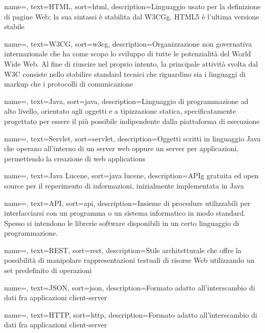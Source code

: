 {
	name=,
	text=HTML,
	sort=html,
	description={Linguaggio usato per la definizione di pagine Web; la sua sintassi è stabilita dal \gls{W3CGg}. HTML5 è l’ultima versione stabile}
}

{
	name=,
	text=W3CG,
	sort=w3cg,
	description={Organizzazione non governativa internazionale che ha come scopo lo sviluppo di tutte le potenzialità del World Wide Web. Al fine di riuscire nel proprio intento, la principale attività svolta dal W3C consiste nello stabilire standard tecnici che riguardino sia i linguaggi di markup che i protocolli di comunicazione}
}

{
	name=,
	text=Java,
	sort=java,
	description={Linguaggio di programmazione ad alto livello, orientato agli oggetti e a tipizzazione statica, specificatamente progettato per essere il più possibile indipendente dalla piattaforma di esecuzione}
}

{
	name=,
	text=Servlet,
	sort=servlet,
	description={Oggetti scritti in linguaggio \gls{Java} che operano all'interno di un server web oppure un server per applicazioni, permettendo la creazione di web applications}
}

{
	name=,
	text=Java Lucene,
	sort=java lucene,
	description={\gls{APIg} gratuita ed \gls{open source} per il reperimento di informazioni, inizialmente implementata in \gls{Java}}
}

{
	name=,
	text=API,
	sort=api,
	description={Insieme di procedure utilizzabili per interfacciarsi con un programma o un sistema informatico in modo standard. Spesso si intendono le librerie software disponibili in un certo linguaggio di programmazione.
	}
}

{
	name=,
	text=REST,
	sort=rest,
	description={Stile architetturale che offre la possibilità di manipolare rappresentazioni testuali di risorse Web utilizzando un set predefinito di operazioni}
}

{
	name=,
	text=JSON,
	sort=json,
	description={Formato adatto all'interscambio di dati fra applicazioni client-server}
}

{
	name=,
	text=HTTP,
	sort=http,
	description={Formato adatto all'interscambio di dati fra applicazioni client-server}
}

